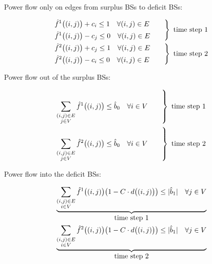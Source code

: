 \noindent
Power flow only on edges from surplus BSs to deficit BSs:



\begin{equation}\label{ineq2}
\begin{aligned}
&{\left.\begin{aligned}
&\hat{f}^1\big((i,j)\big) + c_i \leq 1  \quad \forall (i,j)\in E\\
&\hat{f}^1\big((i,j)\big) - c_j \leq 0 \quad \forall (i,j)\in E
\end{aligned} \quad \quad \right\rbrace}\enskip\text{time step 1}\\
&{\left.\begin{aligned}
&\hat{f}^2\big((i,j)\big) + c_j \leq 1  \quad \forall (i,j)\in E\\
&\hat{f}^2\big((i,j)\big) - c_i \leq 0 \quad \forall (i,j)\in E
\end{aligned} \quad \quad \right\rbrace}\enskip\text{time step 2}
\end{aligned}
\end{equation}




\noindent
Power flow out of the surplus BSs:



\begin{equation}\label{ineq3}
\begin{aligned}
 &{\left.\sum_{\substack{(i,j) \in E\\ j\in V}} \hat{f}^1\big((i,j)\big)\leq \hat{b}_0\quad \forall i\in V \quad \quad \right\rbrace}\enskip\text{time step 1}\\
 &{\left.\sum_{\substack{(i,j) \in E\\ j\in V}} \hat{f}^2\big((i,j)\big)\leq \hat{b}_0\quad \forall i\in V \quad \quad \right\rbrace}\enskip\text{time step 2}
\end{aligned}
\end{equation}





\noindent
Power flow into the deficit BSs:



\begin{equation}\label{ineq4}
\begin{aligned}
 &\underbrace{{\sum_{\substack{ (i,j) \in E\\i\in V}} \hat{f}^1\big((i,j)\big)\big(1-C \cdot d\big((i,j)\big)\big)\leq |\hat{b}_1|\quad \forall j\in V }}_{\text{\normalsize{time step 1}}}\\
 &\underbrace{{\sum_{\substack{ (i,j) \in E\\i\in V}} \hat{f}^2\big((i,j)\big)\big(1-C \cdot d\big((i,j)\big)\big)\leq |\hat{b}_1|\quad \forall j\in V }}_{\text{\normalsize{time step 2}}}
\end{aligned}
\end{equation}





